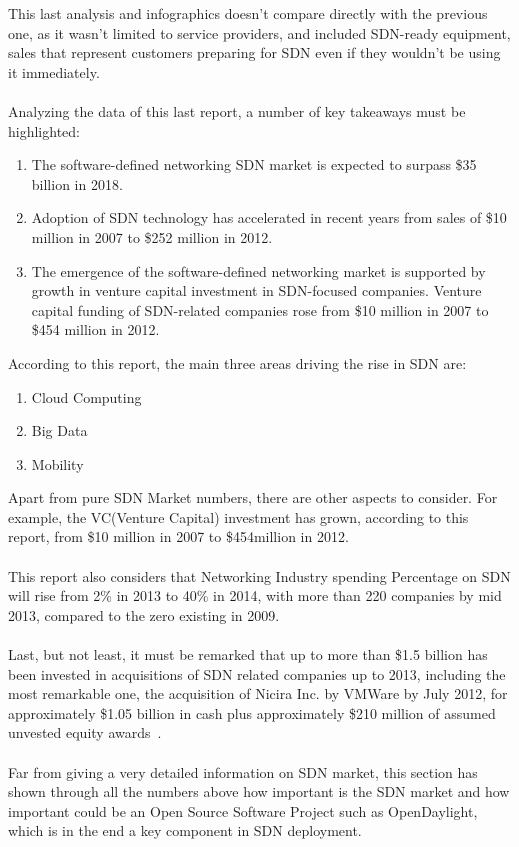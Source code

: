 \documentclass[a4paper, 12pt]{book}
\begin{document}
This last analysis and infographics doesn’t compare directly with the previous one, as it wasn’t limited to service providers, and included SDN-ready equipment, sales that represent customers preparing for SDN even if they wouldn’t be using it immediately.\\
\\
Analyzing the data of this last report, a number of key takeaways must be highlighted:
\begin{enumerate}\itemsep0pt
 \item{The software-defined networking SDN market is expected to surpass \$35 billion in 2018}.
 \item{Adoption of SDN technology has accelerated in recent years from sales of \$10 million in 2007 to \$252 million in 2012}.
 \item{The emergence of the software-defined networking market is supported by growth in venture capital investment in SDN-focused companies}. Venture capital funding of SDN-related companies rose from \$10 million in 2007 to \$454 million in 2012.
\end{enumerate}

According to this report, the main three areas driving the rise in SDN are:
\begin{enumerate}\itemsep0pt
\item{Cloud Computing}
\item{Big Data}
\item{Mobility}
\end{enumerate}
Apart from pure SDN Market numbers, there are other aspects to consider. For example, the VC(Venture Capital) investment has grown, according to this report, from \$10 million in 2007 to \$454million in 2012.\\
\\
This report also considers that Networking Industry spending Percentage on SDN will rise from 2\% in 2013 to 40\% in 2014, with more than 220 companies by mid 2013, compared to the zero existing in 2009.\\
\\
Last, but not least, it must be remarked that up to more than \$1.5 billion has been invested in acquisitions of SDN related companies up to 2013, including the most remarkable one, the acquisition of Nicira Inc. by VMWare by July 2012, for approximately \$1.05 billion in cash plus approximately \$210 million of assumed unvested equity awards~\cite{VMWareAcquireNicira}.\\
\\
Far from giving a very detailed information on SDN market, this section has shown through all the numbers above how important is the SDN market and how important could be an Open Source Software Project such as OpenDaylight, which is in the end a key component in SDN deployment.
\end{document}
